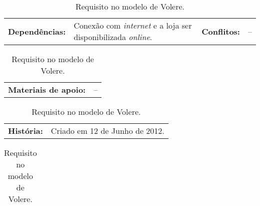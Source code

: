 \begin{table}[h]
    \vspace{5pt}
    \begin{tabularx}{\textwidth}{p{}p{}
                                 p{}p{}}
        \textbf{Dependências:} & Conexão com \emph{internet} e
        a loja ser disponibilizada \emph{online}.
        & \textbf{Conflitos:} &--\\
    \end{tabularx}
    
    \vspace{5pt}
    \begin{tabularx}{\textwidth}{p{} p{}}
        \textbf{Materiais de apoio:} &
       --
    \end{tabularx}
    
    \vspace{5pt}
    \begin{tabularx}{\textwidth}{p{} p{}}
        \textbf{História:} &
        Criado em 12 de Junho de 2012. \\
    \end{tabularx}
    
    \begin{tabularx}{\textwidth}{c}
        \bottomrule
    \end{tabularx}
    
    \caption{ \label{Volere7} Requisito no modelo de Volere. }
\end{table}
